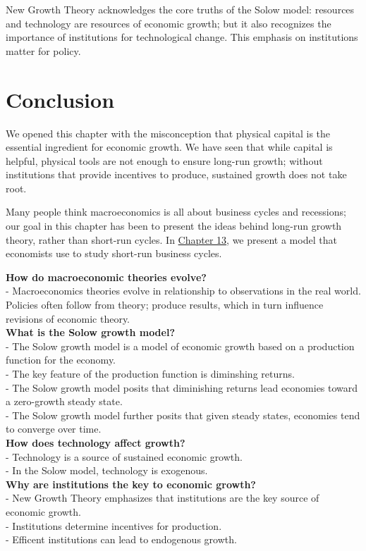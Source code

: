 \documentclass[11pt]{article} %
\begin{document}
New Growth Theory acknowledges the core truths of the Solow model: resources and technology are resources of economic growth; but it also recognizes the importance of institutions for technological change. This emphasis on institutions matter for policy.

\section*{\textbf{Conclusion}}
We opened this chapter with the misconception that physical capital is the essential ingredient for economic growth. We have seen that while capital is helpful, physical tools are not enough to ensure long-run growth; without institutions that provide incentives to produce, sustained growth does not take root.

Many people think macroeconomics is all about business cycles and recessions; our goal in this chapter has been to present the ideas behind long-run growth theory, rather than short-run cycles. In \underline{Chapter 13}, we present a model that economists use to study short-run business cycles.

\begin{tcolorbox}[width=\textwidth,colback={white},title={Answering the Big Questions},colbacktitle=yellow,coltitle=blue]
\textbf{How do macroeconomic theories evolve?}\\
- Macroeconomics theories evolve in relationship to observations in the real world. Policies often follow from theory; produce results, which in turn influence revisions of economic theory.\\
\textbf{What is the Solow growth model?}\\
- The Solow growth model is a model of economic growth based on a production function for the economy.\\
- The key feature of the production function is diminshing returns. \\
- The Solow growth model posits that diminishing returns lead economies toward a zero-growth steady state.\\
- The Solow growth model further posits that given steady states, economies tend to converge over time.\\
\textbf{How does technology affect growth?} \\
- Technology is a source of sustained economic growth.\\
- In the Solow model, technology is exogenous.\\
\textbf{Why are institutions the key to economic growth?}\\
- New Growth Theory emphasizes that institutions are the key source of economic growth.\\
- Institutions determine incentives for production.\\
- Efficent institutions can lead to endogenous growth.\\
\end{tcolorbox}
\end{document}
